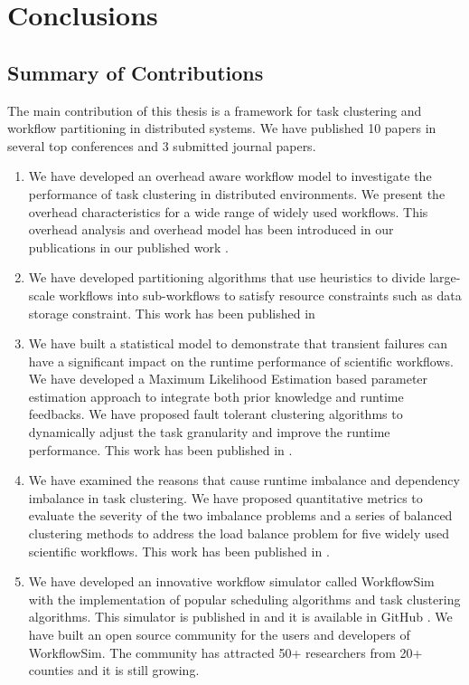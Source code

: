 \chapter{Conclusions}

\section{Summary of Contributions}


The main contribution of this thesis is a framework for task clustering and workflow partitioning in distributed systems. We have published 10 papers in several top conferences and 3 submitted journal papers. 
\begin{enumerate}
\item We have developed an overhead aware workflow model to investigate the performance of task clustering in distributed environments. We present the overhead characteristics for a wide range of widely used workflows. This overhead analysis and overhead model has been introduced in our publications in our published work \cite{Chen2013a, Chen2011, Chen2013b}. 
\item We have developed partitioning algorithms that use heuristics to divide large-scale workflows into sub-workflows to satisfy resource constraints such as data storage constraint. This work has been published in \cite{Chen2011a, Integration2012}
\item We have built a statistical model to demonstrate that transient failures can have a significant impact on the runtime performance of scientific workflows. We have developed a Maximum Likelihood Estimation based parameter estimation approach to integrate both prior knowledge and runtime feedbacks. We have proposed fault tolerant clustering algorithms to dynamically adjust the task granularity and improve the runtime performance. This work has been published in \cite{Chen2012}. 
\item We have examined the reasons that cause runtime imbalance and dependency imbalance in task clustering. We have proposed quantitative metrics to evaluate the severity of the two imbalance problems and a series of balanced clustering methods to address the load balance problem for five widely used scientific workflows. This work has been published in \cite{Chen2013a, Chen2013b}. 
\item We have developed an innovative workflow simulator called WorkflowSim with the implementation of popular scheduling algorithms and task clustering algorithms. This simulator is published in \cite{WorkflowSim} and it is available in GitHub \cite{WorkflowSim-Github}. 
We have built an open source community for the users and developers of WorkflowSim. The community has attracted 50+ researchers from 20+ counties and it is still growing. 
\end{enumerate}



